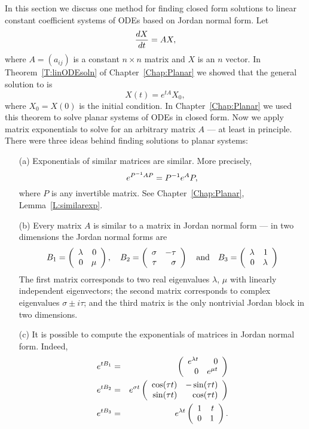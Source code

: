 In this section we discuss one method for finding 
closed form solutions to 
linear constant coefficient systems of ODEs based on 
Jordan normal form. Let  
\begin{equation}  \label{eq:linsys}
\displaystyle\frac{dX}{dt} = AX,
\end{equation}
where $A=(a_{ij})$ is a constant $n\times n$ matrix and $X$ is an 
$n$ vector.  In Theorem~\ref{T:linODEsoln} of Chapter~\ref{Chap:Planar} 
we showed that the general solution to 
 is
\[
X(t) = e^{tA}X_0,
\]
where $X_0=X(0)$ is the initial condition.  
In Chapter~\ref{Chap:Planar} 
we used this theorem to solve planar systems of ODEs in closed form.
Now we apply matrix exponentials to solve  for an 
arbitrary matrix $A$ --- at least in principle.
There were three ideas behind finding solutions to planar systems:
\begin{itemize}
\item[(a)] Exponentials of similar 
matrices are similar.  More precisely,
\[
e^{P^{-1} AP} = P^{-1} e^{A}P,
\]
where $P$ is any invertible matrix.  
See Chapter~\ref{Chap:Planar}, Lemma~\ref{L:similarexp}.
\item[(b)]	Every matrix $A$ is similar to a matrix in Jordan normal 
form --- in two dimensions the Jordan normal forms are
\[
B_1=\left(\begin{array}{rr} \lambda & 0\\ 0 &\mu\end{array}\right), \quad B_2=\left(\begin{array}{rr} \sigma & -\tau\\ \tau &\sigma\end{array}\right)
\quad\mbox{and}\quad B_3=\left(\begin{array}{rr} \lambda & 1\\ 0 &\lambda\end{array}\right)
\]
The first matrix corresponds to two 
real eigenvalues $\lambda$, $\mu$
with linearly independent eigenvectors; the second matrix 
corresponds to complex eigenvalues 
$\sigma\pm i\tau$; and the third matrix is the only nontrivial 
Jordan block in two dimensions.
\item[(c)]	It is possible to compute the exponentials of matrices in
Jordan normal form.  Indeed,
\begin{eqnarray*}
e^{tB_1} &  = & \left(\begin{array}{rr} e^{\lambda t} & 0\\ 0 &e^{\mu t}\end{array}\right) \\
e^{tB_2} & = & 
e^{\sigma t}\left(\begin{array}{rr} \cos(\tau t) & -\sin(\tau t)\\ \sin(\tau t) &\cos(\tau t)\end{array}\right) \\
e^{tB_3} & = &  e^{\lambda t}\left(\begin{array}{rr} 1 & t\\ 0 &1\end{array}\right).
\end{eqnarray*}
\end{itemize}


